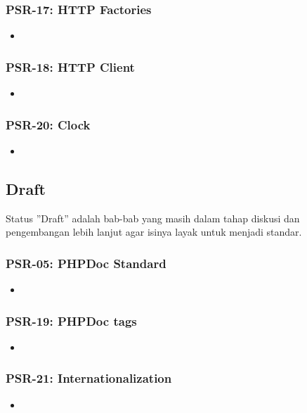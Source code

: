 \subsubsection{PSR-17: HTTP Factories}
\label{subsubsec:psr17}
\begin{itemize}
	\item
\end{itemize}

\subsubsection{PSR-18: HTTP Client}
\label{subsubsec:psr18}
\begin{itemize}
	\item
\end{itemize}

\subsubsection{PSR-20: Clock}
\label{subsubsec:psr20}
\begin{itemize}
	\item
\end{itemize}

\subsection{Draft}
\label{subsec:draft}
Status ''Draft'' adalah bab-bab yang masih dalam tahap diskusi dan pengembangan lebih lanjut agar isinya layak untuk menjadi standar.

\subsubsection{PSR-05: PHPDoc Standard}
\label{subsubsec:psr05}
\begin{itemize}
	\item
\end{itemize}

\subsubsection{PSR-19: PHPDoc tags}
\label{subsubsec:psr19}
\begin{itemize}
	\item
\end{itemize}

\subsubsection{PSR-21: Internationalization}
\label{subsubsec:psr21}
\begin{itemize}
	\item
\end{itemize}

